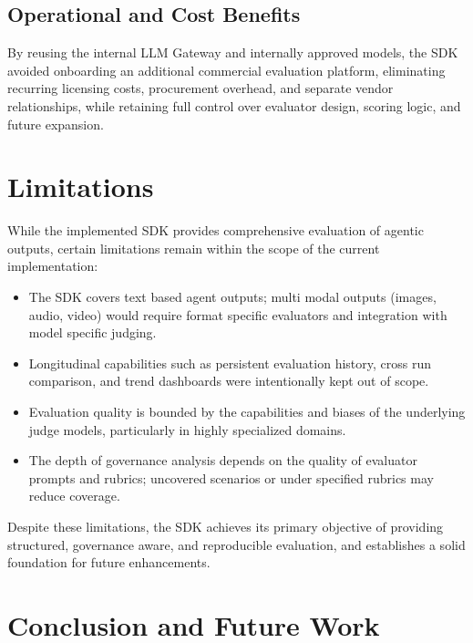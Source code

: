\documentclass[12pt, a4paper, oneside]{report}
\begin{document}
\section{Operational and Cost Benefits}

By reusing the internal LLM Gateway and internally approved models, the SDK avoided onboarding an additional commercial evaluation platform, eliminating recurring licensing costs, procurement overhead, and separate vendor relationships, while retaining full control over evaluator design, scoring logic, and future expansion.

\newpage
\chapter{Limitations}

While the implemented SDK provides comprehensive evaluation of agentic outputs, certain limitations remain within the scope of the current implementation:

\begin{itemize}
    \item The SDK covers text based agent outputs; multi modal outputs (images, audio, video) would require format specific evaluators and integration with model specific judging.
    \item Longitudinal capabilities such as persistent evaluation history, cross run comparison, and trend dashboards were intentionally kept out of scope.
    \item Evaluation quality is bounded by the capabilities and biases of the underlying judge models, particularly in highly specialized domains.
    \item The depth of governance analysis depends on the quality of evaluator prompts and rubrics; uncovered scenarios or under specified rubrics may reduce coverage.
\end{itemize}

Despite these limitations, the SDK achieves its primary objective of providing structured, governance aware, and reproducible evaluation, and establishes a solid foundation for future enhancements.

\chapter{Conclusion and Future Work}
\end{document}
